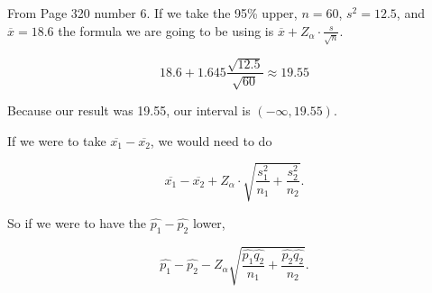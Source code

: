 \section{}

\subsection{}

\subsection{}

\subsection{}

	\begin{problem}
		From Page 320 number 6. If we take the 95\% upper, $n=60$, $s^2=12.5$, and $\overline{x}=18.6$ the formula we are going to be using is $\overline{x}+Z_\alpha\cdot \frac{s}{\sqrt{n} }$.

		\begin{equation}
			18.6+1.645 \frac{\sqrt{12.5}}{\sqrt{60}}\approx19.55
		\end{equation}

		Because our result was 19.55, our interval is $(-\infty, 19.55)$.
	\end{problem}

	If we were to take $\overline{x_1}-\overline{x_2}$, we would need to do 

	\begin{equation}
		\overline{x_1}-\overline{x_2}+Z_\alpha\cdot \sqrt{\frac{s_1^2}{n_1}+\frac{s_2^2}{n_2}}.
	\end{equation}

	So if we were to have the $\hat{p_1}-\hat{p_2}$ lower,

	\begin{equation}
		\hat{p_1}-\hat{p_2}-Z_\alpha\sqrt{\frac{\hat{p_1}\hat{q_2}}{n_1}+\frac{\hat{p_2}\hat{q_2}}{n_2}}.
	\end{equation}


